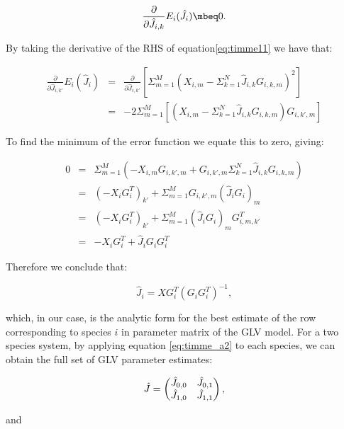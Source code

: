 \begin{equation}\label{eq:timme12}
\frac{\partial}{\partial \hat{J}_{i,k}} E_i(\hat{J}_i) \mbeq 0.
\end{equation}

By taking the derivative of the RHS of equation\ref{eq:timme11} we have that:


\begin{eqnarray}
\frac{\partial}{\partial \hat{J}_{i,k'}} E_i(\hat{J}_i) &=& \frac{\partial}{\partial \hat{J}_{i,k'}} [\Sigma_{m=1}^{M}(X_{i,m} - \Sigma_{k=1}^{N}\hat{J}_{i,k}G_{i,k,m})^2] \nonumber \\
    &=& -2\Sigma_{m=1}^{M}[(X_{i,m} - \Sigma_{k=1}^{N}\hat{J}_{i,k}G_{i,k,m})G_{i,k',m}] \nonumber
\end{eqnarray}

To find the minimum of the error function we equate this to zero, giving:

\begin{eqnarray}
0 &=& \Sigma_{m=1}^{M}(-X_{i,m}G_{i,k',m} + G_{i,k',m}\Sigma_{k=1}^{N}\hat{J}_{i,k}G_{i,k,m}) \nonumber \\
  &=& (-X_iG_i^T)_{k'} + \Sigma_{m=1}^{M}G_{i,k',m}(\hat{J}_iG_i)_m   \nonumber \\
  &=& (-X_iG_i^T)_{k'} + \Sigma_{m=1}^{M}(\hat{J}_iG_i)_mG_{i,m,k'}^T  \nonumber \\
   &=& -X_iG_i^T + \hat{J}_iG_iG_i^T 
\end{eqnarray}

Therefore we conclude that:

\begin{equation}\label{eq:timme_a2}
\hat{J}_i = XG^T_i(G_iG^T_i)^{-1},
\end{equation}

which, in our case, is the analytic form for the best estimate of the row corresponding to species $i$ in parameter matrix of the GLV model. For a two species system, by applying equation \ref{eq:timme_a2} to each species, we can obtain the full set of GLV parameter estimates: 

\begin{equation}\label{eq:timme_estimates}
\hat{J} =
\begin{pmatrix}
 \hat{J}_{0,0} & \hat{J}_{0,1} \\
 \hat{J}_{1,0} & \hat{J}_{1,1}
 \end{pmatrix}\\,
\end{equation}

and

